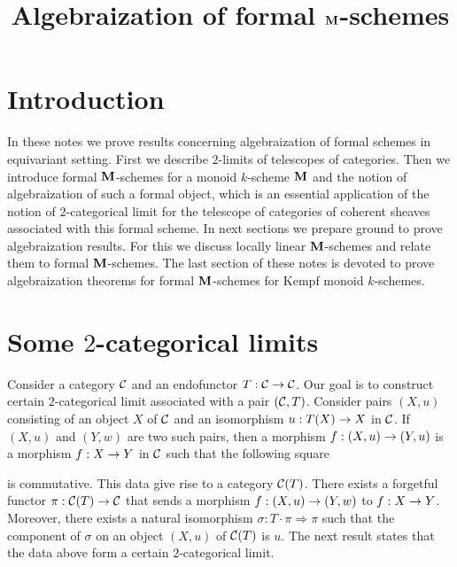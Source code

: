 

\usepackage{todonotes}
\newcommand{\lstodo}[1]{\todo[color=green!40,bordercolor=green,size=\footnotesize]{\textbf{LS TODO: }#1}}



\title{Algebraization of formal $\mathbf{M}$-schemes}
\date{}
\maketitle

\section{Introduction}
\noindent
In these notes we prove results concerning algebraization of formal schemes in equivariant setting. First we describe $2$-limits of telescopes of categories. Then we introduce formal $\mathbf{M}$-schemes for a monoid $k$-scheme $\mathbf{M}$ and the notion of algebraization of such a formal object, which is an essential application of the notion of $2$-categorical limit for the telescope of categories of coherent sheaves associated with this formal scheme. In next sections we prepare ground to prove algebraization results. For this we discuss locally linear $\mathbf{M}$-schemes and relate them to formal $\mathbf{M}$-schemes. The last section of these notes is devoted to prove algebraization theorems for formal $\mathbf{M}$-schemes for Kempf monoid $k$-schemes. 

\section{Some $2$-categorical limits}
\noindent
Consider a category ${\mathcal C}$ and an endofunctor $T:{\mathcal C}\rightarrow {\mathcal C}$. Our goal is to construct certain $2$-categorical limit associated with a pair $({\mathcal C},T)$. Consider pairs $\left(X,u\right)$ consisting of an object $X$ of ${\mathcal C}$ and an isomorphism $u:T(X)\rightarrow X$ in ${\mathcal C}$. If $\left(X,u\right)$ and $\left(Y,w\right)$ are two such pairs, then a morphism $f:(X,u) \rightarrow (Y,u)$ is a morphism $f:X\rightarrow Y$ in ${\mathcal C}$ such that the following square
\begin{center}
\end{center}
is commutative. This data give rise to a category ${\mathcal C}(T)$. There exists a forgetful functor $\pi:{\mathcal C}(T)\rightarrow {\mathcal C}$ that sends a morphism $f:(X,u)\rightarrow (Y,w)$ to $f:X\rightarrow Y$. Moreover, there exists a natural isomorphism $\sigma:T\cdot \pi \Rightarrow \pi$ such that the component of $\sigma$ on an object $(X,u)$ of ${\mathcal C}(T)$ is $u$. The next result states that the data above form a certain $2$-categorical limit.

